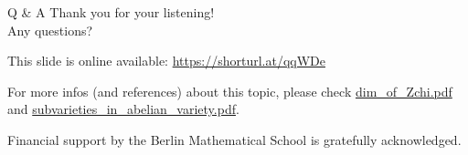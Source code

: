 \documentclass[pdf]{beamer}
\numberwithin{equation}{section}
\theoremstyle{plain}
\theoremstyle{plain}
\theoremstyle{remark}
\begin{document}
\begin{frame}[fragile]{Q \& A}
Thank you for your listening! 
\\[3mm]
Any questions?

\vspace{8mm}




This slide is online available:
\href{https://github.com/ramified/personal_tex_collection/raw/main/PhD_thesis_raw_data/talk_12min/Bologna_zxx_intro_to_Zchi.pdf}{https://shorturl.at/qqWDe}


For more infos (and references) about this topic, please check \href{https://github.com/ramified/personal_tex_collection/blob/main/PhD_thesis_raw_data/dim_of_Zchi.pdf}{dim\_of\_Zchi.pdf} and \href{https://github.com/ramified/personal_tex_collection/raw/main/PhD_thesis_raw_data/subvarieties/subvarieties_in_abelian_variety.pdf}{subvarieties\_in\_abelian\_variety.pdf}.

\vspace{8mm}
Financial support by the Berlin Mathematical School is gratefully acknowledged.


\end{frame}
\end{document}
